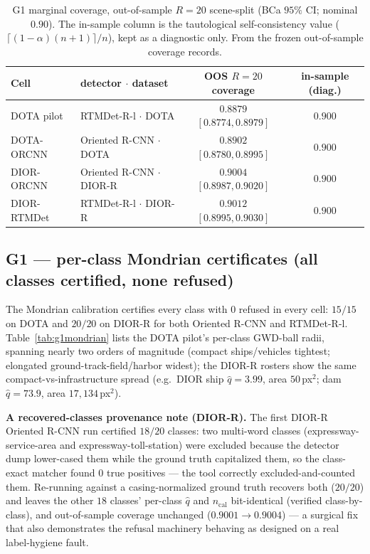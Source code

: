 \documentclass[11pt]{article}
\begin{document}
\begin{table}[t]\centering\small
\caption{G1 marginal coverage, out-of-sample $R{=}20$ scene-split (BCa $95\%$ CI; nominal $0.90$).
The in-sample column is the tautological self-consistency value ($\lceil(1-\alpha)(n+1)\rceil/n$), kept as a
diagnostic only. From the frozen out-of-sample coverage records.}\label{tab:g1oos}
\begin{tabular}{llcc}
\toprule
Cell & detector $\cdot$ dataset & OOS $R{=}20$ coverage & in-sample (diag.) \\
\midrule
DOTA pilot          & RTMDet-R-l $\cdot$ DOTA   & $0.8879$ $[0.8774,0.8979]$ & $0.900$ \\
DOTA-ORCNN          & Oriented R-CNN $\cdot$ DOTA & $0.8902$ $[0.8780,0.8995]$ & $0.900$ \\
DIOR-ORCNN          & Oriented R-CNN $\cdot$ DIOR-R & $0.9004$ $[0.8987,0.9020]$ & $0.900$ \\
DIOR-RTMDet         & RTMDet-R-l $\cdot$ DIOR-R & $0.9012$ $[0.8995,0.9030]$ & $0.900$ \\
\bottomrule
\end{tabular}
\end{table}

\subsection{G1 --- per-class Mondrian certificates (all classes certified, none refused)}
The Mondrian calibration certifies every class with $0$ refused in every cell: $15/15$ on DOTA and
$20/20$ on DIOR-R for both Oriented R-CNN and RTMDet-R-l. Table~\ref{tab:g1mondrian} lists the DOTA pilot's
per-class GWD-ball radii, spanning nearly two orders of magnitude (compact ships/vehicles tightest;
elongated ground-track-field/harbor widest); the DIOR-R rosters show the same compact-vs-infrastructure spread
(e.g.\ DIOR ship $\hat q{=}3.99$, area $50$\,px$^2$; dam $\hat q{=}73.9$, area $17{,}134$\,px$^2$).

\textbf{A recovered-classes provenance note (DIOR-R).} The first DIOR-R Oriented R-CNN run certified $18/20$
classes: two multi-word classes (expressway-service-area and expressway-toll-station) were
excluded because the detector dump lower-cased them while the ground truth capitalized them, so the
class-exact matcher found $0$ true positives --- the tool correctly excluded-and-counted them. Re-running
against a casing-normalized ground truth recovers both ($20/20$) and leaves the other $18$ classes'
per-class $\hat q$ and $n_{\mathrm{cal}}$ bit-identical (verified class-by-class), and out-of-sample
coverage unchanged ($0.9001\!\to\!0.9004$) --- a surgical fix that also demonstrates the refusal machinery
behaving as designed on a real label-hygiene fault.
\end{document}
